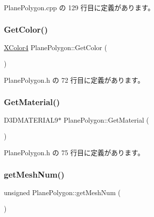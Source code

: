  Plane\+Polygon.\+cpp の 129 行目に定義があります。

\mbox{\label{class_plane_polygon_ac4f8f7b51acdb744231efd342d3b2734}} 
\subsubsection{\texorpdfstring{Get\+Color()}{GetColor()}}
{\footnotesize\ttfamily \mbox{\hyperlink{_vector3_d_8h_a680c30c4a07d86fe763c7e01169cd6cc}{X\+Color4}} Plane\+Polygon\+::\+Get\+Color (\begin{DoxyParamCaption}{ }\end{DoxyParamCaption})\hspace{0.3cm}{\ttfamily [inline]}}



 Plane\+Polygon.\+h の 72 行目に定義があります。

\mbox{\label{class_plane_polygon_a808087c9d82c0eb7cfb0709c9906e833}} 
\subsubsection{\texorpdfstring{Get\+Material()}{GetMaterial()}}
{\footnotesize\ttfamily D3\+D\+M\+A\+T\+E\+R\+I\+A\+L9$\ast$ Plane\+Polygon\+::\+Get\+Material (\begin{DoxyParamCaption}{ }\end{DoxyParamCaption})\hspace{0.3cm}{\ttfamily [inline]}}



 Plane\+Polygon.\+h の 75 行目に定義があります。

\mbox{\label{class_plane_polygon_a494068044805bdd4054bc69328c71d7f}} 
\subsubsection{\texorpdfstring{get\+Mesh\+Num()}{getMeshNum()}}
{\footnotesize\ttfamily unsigned Plane\+Polygon\+::get\+Mesh\+Num (\begin{DoxyParamCaption}{ }\end{DoxyParamCaption})\hspace{0.3cm}{\ttfamily [inline]}}



